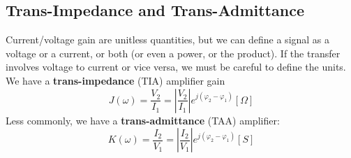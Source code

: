 \subsection{Trans-Impedance and Trans-Admittance}
Current/voltage gain are unitless quantities, but we can define a signal as a voltage or a current, or both (or even a power, or the product).   If the transfer involves voltage to current or vice versa, we must be careful to define the units.  We have a \textbf{trans-impedance} (TIA) amplifier gain
    \begin{equation}
        J(\omega ) = \frac{{{V_2}}}{{{I_1}}} = \left| {\frac{{{V_2}}}{{{I_1}}}} \right|{e^{j({\varphi _2} - {\varphi _1})}}  [\Omega ]
    \end{equation}
Less commonly, we have a \textbf{trans-admittance} (TAA) amplifier:
    \begin{equation}
        K(\omega ) = \frac{{{I_2}}}{{{V_1}}} = \left| {\frac{{{I_2}}}{{{V_1}}}} \right|{e^{j({\varphi _2} - {\varphi _1})}}  [S]
    \end{equation}
